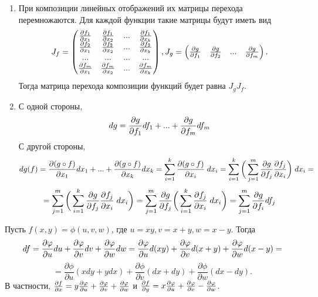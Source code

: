     \begin{explanation}
    	\begin{enumerate}
    		\item При композиции линейных отображений их матрицы перехода перемножаются. Для каждой функции такие матрицы будут иметь вид
    		\[ J_f = \begin{pmatrix}
    			\frac{\partial f_1}{\partial x_1} & \frac{\partial f_1}{\partial x_2} & ... & \frac{\partial f_1}{\partial x_k} \\
    			\frac{\partial f_2}{\partial x_1} & \frac{\partial f_2}{\partial x_2} & ... & \frac{\partial f_2}{\partial x_k} \\
    			... & ... & ... & ... \\
    			\frac{\partial f_m}{\partial x_1} & \frac{\partial f_m}{\partial x_2} & ... & \frac{\partial f_m}{\partial x_k}
    		\end{pmatrix},
    		J_g = \begin{pmatrix}
    			\frac{\partial g}{\partial f_1} & \frac{\partial g}{\partial f_2} & ... & \frac{\partial g}{\partial f_m} \\
    		\end{pmatrix}. \]
    		Тогда матрица перехода композиции функций будет равна $J_g J_f$.
    		\item С одной стороны,
    		\[ dg = \frac{\partial g}{\partial f_1} df_1 + ... + \frac{\partial g}{\partial f_m} df_m \]
    		С другой стороны,
    		\[ dg(f) = \pdv{(g \circ f)}{x_1}dx_1 + ... + \pdv{(g \circ f)}{x_k}dx_k = \sum_{i = 1}^k \frac{\partial (g \circ f)}{\partial x_i} \; dx_i = \sum_{i = 1}^k \bigg(\sum_{j = 1}^m \frac{\partial g}{\partial f_j} \frac{\partial f_j}{\partial x_i} \bigg) \; dx_i = \]
    		\[ = \sum_{j = 1}^m \bigg(\sum_{i = 1}^k \frac{\partial g}{\partial f_j} \frac{\partial f_j}{\partial x_i} \; dx_i \bigg) = \sum_{j = 1}^m \frac{\partial g}{\partial f_j} \bigg(\sum_{i = 1}^k \frac{\partial f_j}{\partial x_i} \; dx_i \bigg) = \sum_{j = 1}^m \frac{\partial g}{\partial f_i} df_j \]
    	\end{enumerate}
    \end{explanation}
    
    \begin{example}
    	Пусть $f(x, y) = \phi(u, v, w)$, где $u = xy, v = x + y, w = x - y$. Тогда
    	\[ df = \pdv{\varphi}{u} du + \pdv{\varphi}{v} dv + \pdv{\varphi}{w} dw = \frac{\partial \varphi}{\partial u} d(xy) + \frac{\partial \varphi}{\partial v} d(x + y) + \frac{\partial \varphi}{\partial w} d(x - y) = \]
    	\[ = \frac{\partial \phi}{\partial u}(xdy + ydx) + \frac{\partial \phi}{\partial v}(dx + dy) + \frac{\partial \phi}{\partial w}(dx - dy). \]
    	В частности, $\pdv{f}{x} = y \pdv{\varphi}{u} + \pdv{\varphi}{v} + \pdv{\varphi}{w}$ и $\pdv{f}{y} = x \pdv{\varphi}{u} + \pdv{\varphi}{v} - \pdv{\varphi}{w}$.
    \end{example}
    
